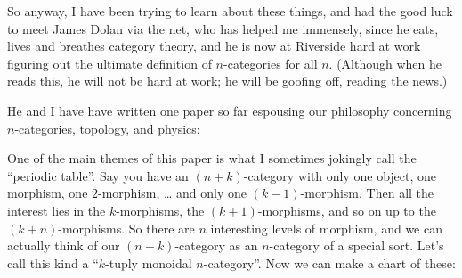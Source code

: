 \documentclass{article}
\def\tightlist{}
\renewcommand{\texttt}[1]{%
  \begingroup
  \ttfamily
  \begingroup\lccode`~=`/\lowercase{\endgroup\def~}{/\discretionary{}{}{}}%
  \begingroup\lccode`~=`[\lowercase{\endgroup\def~}{[\discretionary{}{}{}}%
  \begingroup\lccode`~=`.\lowercase{\endgroup\def~}{.\discretionary{}{}{}}%
  \catcode`/=\active\catcode`[=\active\catcode`.=\active
  \scantokens{#1\noexpand}%
  \endgroup
}
\begin{document}
So anyway, I have been trying to learn about these things, and had the
good luck to meet James Dolan via the net, who has helped me immensely,
since he eats, lives and breathes category theory, and he is now at
Riverside hard at work figuring out the ultimate definition of
\(n\)-categories for all \(n\). (Although when he reads this, he will
not be hard at work; he will be goofing off, reading the news.)

He and I have have written one paper so far espousing our philosophy
concerning \(n\)-categories, topology, and physics:


One of the main themes of this paper is what I sometimes jokingly call
the ``periodic table''. Say you have an \((n+k)\)-category with only one
object, one morphism, one \(2\)-morphism, \ldots{} and only one
\((k-1)\)-morphism. Then all the interest lies in the \(k\)-morphisms,
the \((k+1)\)-morphisms, and so on up to the \((k+n)\)-morphisms. So
there are \(n\) interesting levels of morphism, and we can actually
think of our \((n+k)\)-category as an \(n\)-category of a special sort.
Let's call this kind a ``\(k\)-tuply monoidal \(n\)-category''. Now we
can make a chart of these:
\end{document}
